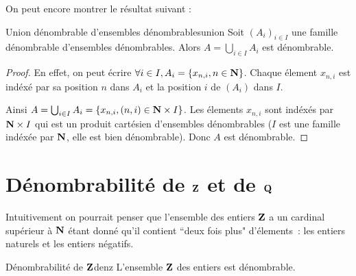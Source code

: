 \documentclass[a4paper,french,final]{memoir}
\begin{document}
On peut encore montrer le résultat suivant :
\begin{theoremb}{Union dénombrable d'ensembles dénombrables}{union}
    Soit $(A_i)_{i \in I}$ une famille dénombrable d'ensembles dénombrables.
	Alors $A= \bigcup_{i \in I} A_i$ est dénombrable.
\end{theoremb}
\begin{proof}
	En effet, on peut écrire $\forall i \in I, A_i = \{x_{n,i}, n \in \mathbf{N}\}$. Chaque élement $x_{n, i}$ est indéxé par sa position $n$ dans $A_i$ et la position $i$ de $(A_i)$ dans $I$.

	Ainsi $A = \bigcup_{i \in I} A_i = \{x_{n, i}, (n,i) \in \mathbf{N} \times I\}$. Les élements $x_{n,i}$ sont indéxés par $\mathbf{N} \times I$ qui est un produit cartésien d'ensembles dénombrables ($I$ est une famille indéxée par $\mathbf{N}$, elle est bien dénombrable). Donc $A$ est dénombrable.
\end{proof}
\section{\texorpdfstring{Dénombrabilité de $\mathbf{Z}$ et de $\mathbf{Q}$}{Dénombrabilité de Z et Q}}

Intuitivement on pourrait penser que l'ensemble des entiers $\mathbf{Z}$ a un cardinal supérieur à $\mathbf{N}$ étant donné qu'il contient ``deux fois plus" d'élements~: les entiers naturels et les entiers négatifs.

\begin{theoremb}{Dénombrabilité de $\mathbf{Z}$}{denz}
	L'ensemble $\mathbf{Z}$ des entiers est dénombrable.
\end{theoremb}
\end{document}
